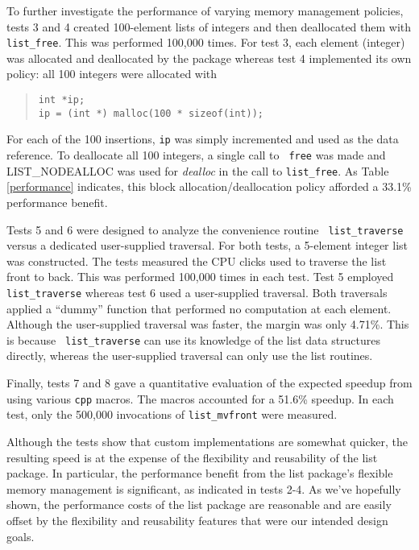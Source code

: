 \documentclass[fullpage,11pt]{article}
\begin{document}
To further investigate the performance of varying memory management policies,
tests 3 and 4 created 100-element lists of integers and then deallocated them
with {\tt list\_free}.  This was performed 100,000 times.  For test 3, each
element (integer) was allocated and deallocated by the package whereas test 4
implemented its own policy: all 100 integers were allocated with
\begin{quote}
\begin{verbatim}
int *ip;
ip = (int *) malloc(100 * sizeof(int));
\end{verbatim}
\end{quote}
For each of the 100 insertions, {\tt ip} was simply incremented and used as
the data reference.  To deallocate all 100 integers, a single call to {\tt
free} was made and LIST\_NODEALLOC was used for {\em dealloc} in the call to
{\tt list\_free}.  As Table
\ref{performance} indicates, this block allocation/deallocation policy
afforded a 33.1\% performance benefit.

Tests 5 and 6 were designed to analyze the convenience routine {\tt
list\_traverse} versus a dedicated user-supplied traversal.  For both tests, a
5-element integer list was constructed.  The tests measured the CPU clicks
used to traverse the list front to back.  This was performed 100,000 times in
each test.  Test 5 employed {\tt list\_traverse} whereas test 6 used a
user-supplied traversal.  Both traversals applied a ``dummy'' function that
performed no computation at each element.  Although the user-supplied
traversal was faster, the margin was only 4.71\%.  This is because {\tt
list\_traverse} can use its knowledge of the list data structures directly,
whereas the user-supplied traversal can only use the list routines.

Finally, tests 7 and 8 gave a quantitative evaluation of the expected speedup
from using various {\tt cpp} macros.  The macros accounted for a 51.6\%
speedup.  In each test, only the 500,000 invocations of {\tt list\_mvfront}
were measured.

Although the tests show that custom implementations are somewhat quicker, the
resulting speed is at the expense of the flexibility and reusability of the
list package.  In particular, the performance benefit from the list package's
flexible memory management is significant, as indicated in tests 2-4.  As
we've hopefully shown, the performance costs of the list package are
reasonable and are easily offset by the flexibility and reusability features
that were our intended design goals.
\end{document}
